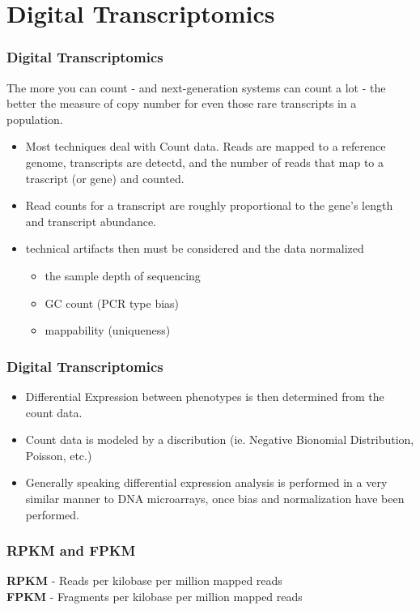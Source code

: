 \documentclass[pdf]{beamer}
\begin{document}

\section{Digital Transcriptomics}
\begin{frame}
  \frametitle{Digital Transcriptomics}
The more you can count - and next-generation systems can count a lot - the better the measure of copy number for even those rare transcripts in a population.\\
\vspace{0.2in}
  \begin{itemize}
   \item Most techniques deal with Count data. Reads are mapped to a reference genome, transcripts are detectd, and the number of reads that map to a trascript (or gene) and counted.
  \item Read counts for a transcript are roughly proportional to the gene's length and transcript abundance.
  \item technical artifacts then must be considered and the data normalized
  \begin{itemize}
    \item the sample depth of sequencing
    \item GC count (PCR type bias)
    \item mappability (uniqueness)
  \end{itemize}  
  \end{itemize}
\end{frame}

\begin{frame}
  \frametitle{Digital Transcriptomics}
  \begin{itemize}
  \item Differential Expression between phenotypes is then determined from the count data.
  \item Count data is modeled by a discribution (ie. Negative Bionomial Distribution, Poisson, etc.)
  \item Generally speaking differential expression analysis is performed in a very similar manner to DNA microarrays, once bias and normalization have  been performed.
  \end{itemize}
\end{frame}

\begin{frame}
\frametitle{RPKM and FPKM}
\textbf{RPKM} - Reads per kilobase per million mapped reads\\
\vspace{0.4in}
\textbf{FPKM} - Fragments per kilobase per million mapped reads\\
\end{frame}
\end{document}
